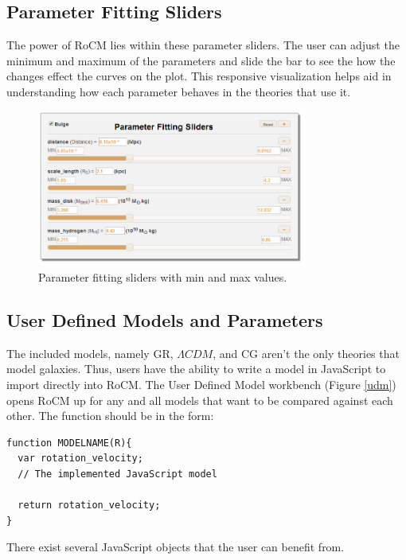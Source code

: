 \documentclass[conference]{IEEEtran}
\begin{document}
\subsection{Parameter Fitting Sliders}

The power of RoCM lies within these parameter sliders. The user can adjust the minimum and maximum of the parameters and slide the bar to see the how the changes effect the curves on the plot. This responsive visualization helps aid in understanding how each parameter behaves in the theories that use it.

\begin{figure}[h!]
\centering
\includegraphics[width=3.5in]{paramslider}%
\caption{Parameter fitting sliders with min and max values.}
\label{slider_fig}
\end{figure}


\subsection{User Defined Models and Parameters}
The included models, namely GR, $\Lambda CDM$, and CG aren't the only theories that model galaxies. Thus, users have the ability to write a model in JavaScript to import directly into RoCM. The User Defined Model workbench (Figure \ref{udm}) opens RoCM up for any and all models that want to be compared against each other. The function should be in the form:
\begin{lstlisting}
function MODELNAME(R){
  var rotation_velocity;
  // The implemented JavaScript model
	
  return rotation_velocity; 
}
\end{lstlisting}


There exist several JavaScript objects that the user can benefit from. 
\end{document}
